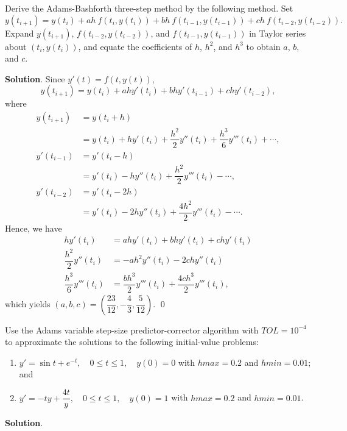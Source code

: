 \documentclass[11pt]{article}
\theoremstyle{break}
\numberwithin{equation}{theorem}
\begin{document}
\newpage
\begin{problem}\label{problem 12} %
    Derive the Adams-Bashforth three-step method by the following method. Set $$y(t_{i+1})=y(t_i)+ah\:f(t_i, y(t_i))+bh\:f(t_{i-1}, y(t_{i-1}))+ch\:f(t_{i-2}, y(t_{i-2})).$$ Expand $y(t_{i+1})$, $f(t_{i-2}, y(t_{i-2}))$, and $f(t_{i-1}, y(t_{i-1}))$ in Taylor series about $(t_i, y(t_i))$, and equate the coefficients of $h$, $h^2$, and $h^3$ to obtain $a$, $b$, and $c$.
\end{problem}
\textbf{Solution}. Since $y'(t)=f(t, y(t))$, \begin{equation*}
    y(t_{i+1})=y(t_i)+ahy'(t_i)+bhy'(t_{i-1})+chy'(t_{i-2}),
\end{equation*}
where
\begin{align*}
    y(t_{i+1})&=y(t_i+h)\\
    &=y(t_i)+hy'(t_i)+\dfrac{h^2}{2}y''(t_i)+\dfrac{h^3}{6}y'''(t_i)+\cdots,\\
    y'(t_{i-1})&=y'(t_i-h)\\
    &=y'(t_i)-hy''(t_i)+\dfrac{h^2}{2}y'''(t_i)-\cdots,\\
    y'(t_{i-2})&=y'(t_i-2h)\\
    &=y'(t_i)-2hy''(t_i)+\dfrac{4h^2}{2}y'''(t_i)-\cdots.
\end{align*}
Hence, we have 
\begin{align*}
    hy'(t_i)&=ahy'(t_i)+bhy'(t_i)+chy'(t_i)\\
    \dfrac{h^2}{2}y''(t_i)&=-ah^2y''(t_i)-2chy''(t_i)\\
    \dfrac{h^3}{6}y'''(t_i)&=\dfrac{bh^3}{2}y'''(t_i)+\dfrac{4ch^3}{2}y'''(t_i),
\end{align*}
which yields $(a, b, c)=\left(\dfrac{23}{12}, -\dfrac{4}{3}, \dfrac{5}{12}\right)$. \qed


\newpage
\begin{problem}\label{problem 13} %
    Use the Adams variable step-size predictor-corrector algorithm with $TOL = 10^{-4}$ to approximate the solutions to the following initial-value problems:
    \begin{enumerate}
        \item $y'=\sin t+e^{-t}, \quad 0\leq t\leq 1, \quad y(0)=0$ with $hmax=0.2$ and $hmin=0.01$; and
        \item $y'=-ty+\dfrac{4t}{y}, \quad 0\leq t\leq 1, \quad y(0)=1$ with $hmax=0.2$ and $hmin=0.01$.
    \end{enumerate}
\end{problem}
\textbf{Solution}. 
\end{document}
